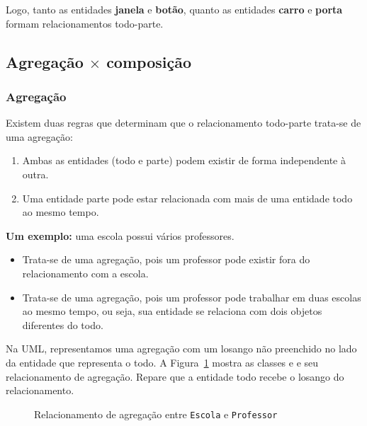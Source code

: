 Logo, tanto as entidades \textbf{janela} e \textbf{botão}, quanto as entidades \textbf{carro} e \textbf{porta} formam relacionamentos todo-parte.

\subsection{Agregação $\times$ composição}
 
\subsubsection{Agregação}
Existem duas regras que determinam que o relacionamento todo-parte trata-se de uma agregação:

\begin{enumerate}
	\item Ambas as entidades (todo e parte) podem existir de forma independente à outra.
	\item Uma entidade parte pode estar relacionada com mais de uma entidade todo ao mesmo tempo.
\end{enumerate}
 
\textbf{Um exemplo:} uma escola possui vários professores.
\begin{itemize}
	\item Trata-se de uma agregação, pois um professor pode existir fora do relacionamento com a escola.
	\item Trata-se de uma agregação, pois um professor pode trabalhar em duas escolas ao mesmo tempo, ou seja, sua entidade se relaciona com dois objetos diferentes do todo.
\end{itemize}

Na UML, representamos uma agregação com um losango não preenchido no lado da entidade que representa o todo. A Figura~\ref{fig:agregacao-professor-escola} mostra as classes  e  e seu relacionamento de agregação. Repare que a entidade todo recebe o losango do relacionamento.

\begin{figure}[h]
	\centering
	
	
	\caption{Relacionamento de agregação entre \texttt{Escola} e \texttt{Professor}}
	\label{fig:agregacao-professor-escola}
\end{figure}

